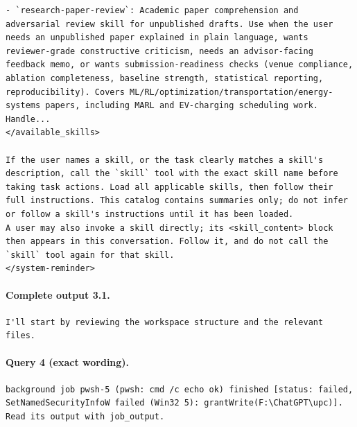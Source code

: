 \documentclass[UTF8,10pt]{ctexart}
\begin{document}
\begin{Verbatim}[breaklines=true,breakanywhere=true,fontsize=\scriptsize,frame=single,framesep=2pt]
- `research-paper-review`: Academic paper comprehension and adversarial review skill for unpublished drafts. Use when the user needs an unpublished paper explained in plain language, wants reviewer-grade constructive criticism, needs an advisor-facing feedback memo, or wants submission-readiness checks (venue compliance, ablation completeness, baseline strength, statistical reporting, reproducibility). Covers ML/RL/optimization/transportation/energy-systems papers, including MARL and EV-charging scheduling work. Handle...
</available_skills>

If the user names a skill, or the task clearly matches a skill's description, call the `skill` tool with the exact skill name before taking task actions. Load all applicable skills, then follow their full instructions. This catalog contains summaries only; do not infer or follow a skill's instructions until it has been loaded.
A user may also invoke a skill directly; its <skill_content> block then appears in this conversation. Follow it, and do not call the `skill` tool again for that skill.
</system-reminder>
\end{Verbatim}

\paragraph{Complete output 3.1.}
\begin{Verbatim}[breaklines=true,breakanywhere=true,fontsize=\scriptsize,frame=single,framesep=2pt]
I'll start by reviewing the workspace structure and the relevant files.
\end{Verbatim}

\paragraph{Query 4 (exact wording).}
\begin{Verbatim}[breaklines=true,breakanywhere=true,fontsize=\scriptsize,frame=single,framesep=2pt]
background job pwsh-5 (pwsh: cmd /c echo ok) finished [status: failed, SetNamedSecurityInfoW failed (Win32 5): grantWrite(F:\ChatGPT\upc)]. Read its output with job_output.
\end{Verbatim}
\end{document}
